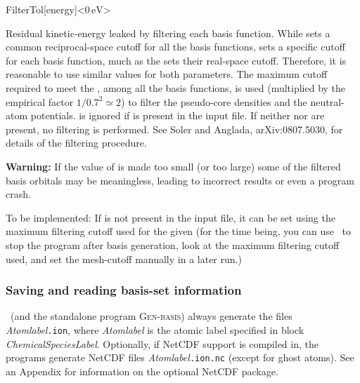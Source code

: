 \begin{fdfentry}{FilterTol}[energy]<$0\,\mathrm{eV}$>

  Residual kinetic-energy leaked by filtering each basis function.
  While  sets a common reciprocal-space cutoff
  for all the basis functions,  sets a specific
  cutoff for each basis function, much as the 
  sets their real-space cutoff. Therefore, it is reasonable to use
  similar values for both parameters.  The maximum cutoff required to
  meet the , among all the basis functions, is used
  (multiplied by the empirical factor $1/0.7^2 \simeq 2$) to filter
  the pseudo-core densities and the neutral-atom
  potentials.  is ignored if 
  is present in the input file.  If neither  nor
   are present, no filtering is performed.  See
  Soler and Anglada, arXiv:0807.5030, for details of the filtering
  procedure.

  \textbf{Warning:} If the value of  is made too
  small (or  too large) some of the filtered basis
  orbitals may be meaningless, leading to incorrect results or even a
  program crash.

  To be implemented: If  is not present in the
  input file, it can be set using the maximum filtering cutoff used
  for the given  (for the time being, you can use
   \fdftrue\ to stop the program after basis generation,
  look at the maximum filtering cutoff used, and set the mesh-cutoff
  manually in a later run.)

\end{fdfentry}



\subsubsection{Saving and reading basis-set information}

\siesta\ (and the standalone program \textsc{Gen-basis})
always generate the files
\textit{Atomlabel}\texttt{.ion}, where \textit{Atomlabel} is the atomic label
specified in block \textit{ChemicalSpeciesLabel}.  Optionally, if
NetCDF support is compiled in, the programs generate
NetCDF files 
\textit{Atomlabel}\texttt{.ion.nc} (except for ghost atoms).
See an Appendix for information on the optional NetCDF package.

